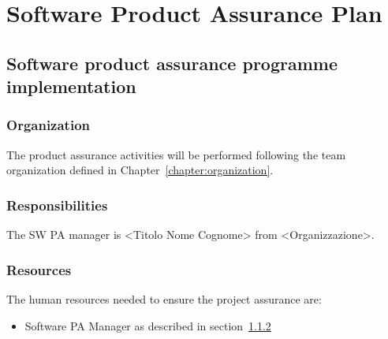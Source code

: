 \chapter{Software Product Assurance Plan}

\section{Software product assurance programme implementation}

\subsection{Organization}
\label{subsec:organization}

The product assurance activities will be performed following the team organization defined in Chapter~\ref{chapter:organization}.

\subsection{Responsibilities}
\label{subsec:resp}


The SW PA manager is <Titolo Nome Cognome> from <Organizzazione>.

\subsection{Resources}
The human resources needed to ensure the project assurance are:
\begin{itemize}
  \item Software PA Manager as described in section~\ref{subsec:resp}%
\end{itemize}


